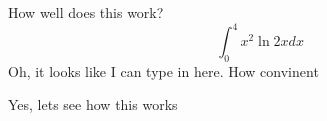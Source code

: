 \documentclass{article}
\begin{document}
How well does this work?
$$\int_0^4 x^2 \ln{2x}dx$$
Oh, it looks like I can type in here. 
How convinent

Yes, lets see how this works
\end{document}
